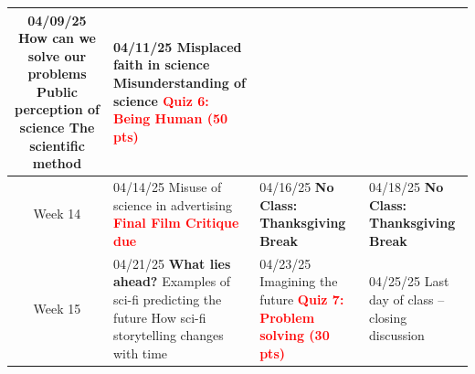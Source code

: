 \documentclass[11pt]{article}
\begin{document}
\begin{tabularx}{\textwidth}{|c|X|X|X|}
    04/09/25 \newline
    \textbf{How can we solve our problems}\newline
    Public perception of science \newline
    The scientific method\newline &

    04/11/25 \newline
    \newline
    Misplaced faith in science \newline
    Misunderstanding of science\newline
    \textcolor{red}{\textbf{Quiz 6: Being Human (50 pts)}} \\

    \hline
    Week 14 & 
    
    04/14/25 \newline
    \newline
    Misuse of science in advertising \newline
    \textcolor{red}{\textbf{Final Film Critique due}} &
    
    \cellcolor{gray!20}04/16/25 \newline
    \newline
    \textbf{No Class: Thanksgiving Break} &

    \cellcolor{gray!20}04/18/25 \newline
    \newline
    \textbf{No Class: Thanksgiving Break} \\


    \hline
    Week 15 & 
    
    04/21/25 \newline
    \textbf{What lies ahead?} \newline
    Examples of sci-fi predicting the future \newline
    How sci-fi storytelling changes with time &
    
    04/23/25 \newline
    \newline
    Imagining the future \newline
    \textcolor{red}{\textbf{Quiz 7: Problem solving (30 pts)}}\newline &


    04/25/25 \newline
    \newline
    Last day of class -- closing discussion \\
    \hline
\end{tabularx}
\end{document}
